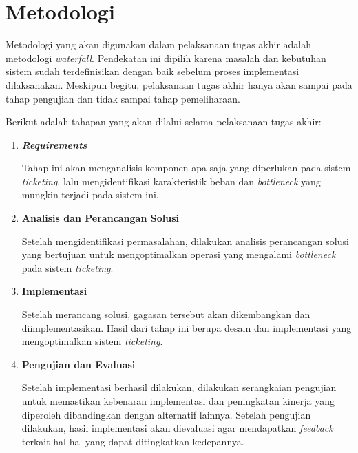 \section{Metodologi}

Metodologi yang akan digunakan dalam pelaksanaan tugas akhir adalah metodologi \textit{waterfall}. Pendekatan ini dipilih karena masalah dan kebutuhan sistem sudah terdefinisikan dengan baik sebelum proses implementasi dilaksanakan. Meskipun begitu, pelaksanaan tugas akhir hanya akan sampai pada tahap pengujian dan tidak sampai tahap pemeliharaan.

Berikut adalah tahapan yang akan dilalui selama pelaksanaan tugas akhir:

\begin{enumerate}
      \item \textbf{\textit{Requirements}}

            Tahap ini akan menganalisis komponen apa saja yang diperlukan pada sistem \textit{ticketing}, lalu mengidentifikasi karakteristik beban dan \textit{bottleneck} yang mungkin terjadi pada sistem ini.

      \item \textbf{Analisis dan Perancangan Solusi}

            Setelah mengidentifikasi permasalahan, dilakukan analisis perancangan solusi yang bertujuan untuk mengoptimalkan operasi yang mengalami \textit{bottleneck} pada sistem \textit{ticketing}.

      \item \textbf{Implementasi}

            Setelah merancang solusi, gagasan tersebut akan dikembangkan dan diimplementasikan. Hasil dari tahap ini berupa desain dan implementasi yang mengoptimalkan sistem \textit{ticketing}.

      \item \textbf{Pengujian dan Evaluasi}

            Setelah implementasi berhasil dilakukan, dilakukan serangkaian pengujian untuk memastikan kebenaran implementasi dan peningkatan kinerja yang diperoleh dibandingkan dengan alternatif lainnya. Setelah pengujian dilakukan, hasil implementasi akan dievaluasi agar mendapatkan \textit{feedback} terkait hal-hal yang dapat ditingkatkan kedepannya.

\end{enumerate}